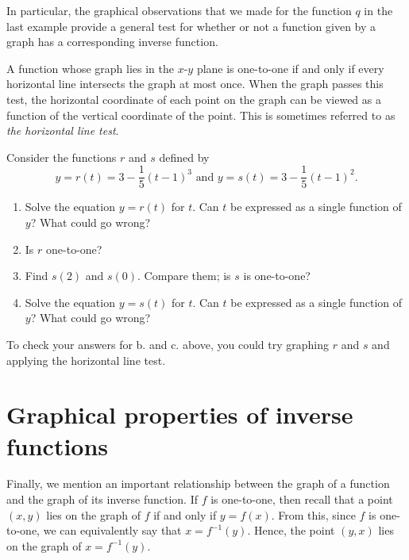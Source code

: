 \documentclass[nooutcomes]{ximera}
\begin{document}
In particular, the graphical observations that we made for the function $q$ in the last example provide a general test for whether or not a function given by a graph has a corresponding inverse function. 

\begin{remark}
A function whose graph lies in the $x$-$y$ plane is one-to-one if and only if every horizontal line intersects the graph at most once.  When the graph passes this test, the horizontal coordinate of each point on the graph can be viewed as a function of the vertical coordinate of the point. This is sometimes referred to as \emph{the horizontal line test}.
\end{remark}



\begin{exploration}
Consider the functions $r$ and $s$ defined by
$$
y = r(t) = 3 - \frac{1}{5}(t-1)^3 \text{ and } y = s(t) = 3 - \frac{1}{5}(t-1)^2.
$$


\begin{enumerate}[label=\alph*.]
\item Solve the equation $y = r(t)$ for $t$. Can $t$ be expressed as a single function of $y$? What could go wrong?
\item Is $r$ one-to-one?
\item Find $s(2)$ and $s(0)$. Compare them; is $s$ is one-to-one?
\item Solve the equation $y = s(t)$ for $t$. Can $t$ be expressed as a single function of $y$? What could go wrong?
\end{enumerate}
\end{exploration}

To check your answers for b. and c. above, you could try graphing $r$ and $s$ and applying the horizontal line test. 


\section{Graphical properties of inverse functions}
Finally, we mention an important relationship between the graph of a function and the graph of its inverse function. If $f$ is one-to-one, then recall that a point $(x, y)$ lies on the graph of $f$ if and only if $y = f(x)$. From this, since $f$ is one-to-one, we can equivalently say that $x = f^{-1}(y)$.  Hence, the point $(y,x)$ lies on the graph of $x = f^{-1}(y)$.
\end{document}
